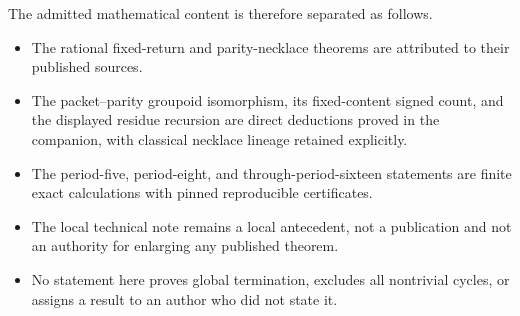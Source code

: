 The admitted mathematical content is therefore separated as follows.
\begin{itemize}[leftmargin=2em]
\item The rational fixed-return and parity-necklace theorems are attributed to
their published sources.
\item The packet--parity groupoid isomorphism, its fixed-content signed count,
and the displayed residue recursion are direct deductions proved in the
companion, with classical necklace lineage retained explicitly.
\item The period-five, period-eight, and through-period-sixteen statements are
finite exact calculations with pinned reproducible certificates.
\item The local technical note remains a local antecedent, not a publication
and not an authority for enlarging any published theorem.
\item No statement here proves global termination, excludes all nontrivial
cycles, or assigns a result to an author who did not state it.
\end{itemize}
